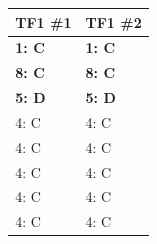 \documentclass{beamer}
\newcommand{\moranresearchfolder}{$HOME/rsc/axelrod-moran}
\begin{document}
    \begin{frame}
        \begin{columns}
            \begin{column}{.6\textwidth}
                \begin{center}
                    \scalebox{.49}{
                        
                    }
                \end{center}
            \end{column}

            \begin{column}{.4\textwidth}
                \small
                \begin{tabular}{ll}
                    \toprule
                    TF1 \#1   & TF1 \#2\\
                    \midrule
                    \bf{1}: C & \bf{1}: C  \\
                    \bf{8}: C & \bf{8}: C  \\
                    \bf{5}: D & \bf{5}: D  \\
                    4: C      & 4: C  \\
                    4: C      & 4: C  \\
                    4: C      & 4: C  \\
                    4: C      & 4: C  \\
                    4: C      & 4: C  \\
                    \bottomrule
                \end{tabular}
            \end{column}
        \end{columns}


    \end{frame}
\end{document}
